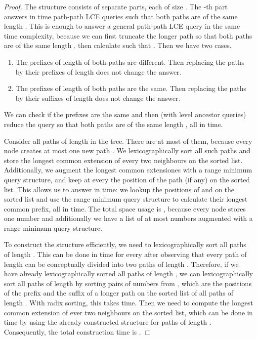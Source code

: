 \documentclass [10pt]{article}
\newcommand{\qed}{\hfill\ensuremath{\Box}\medskip\\\noindent}
\newenvironment{proof}{\noindent\emph{Proof. }}{}
\begin{document}
\begin{proof}
The structure consists of  separate parts, each of size . The -th part answers in  time path-path LCE queries such that both
paths are of the same length . This is enough to answer a general path-path LCE query in the same time complexity, because we can first
truncate the longer path so that both paths are of the same length , then calculate  such that . Then
we have two cases.

\begin{enumerate}
\item The prefixes of length  of both paths are different. Then replacing the paths by their prefixes of length  does not
change the answer.
\item The prefixes of length  of both paths are the same. Then replacing the paths by their suffixes of length  does not
change the answer.
\end{enumerate}

We can check if the prefixes are the same and then (with level ancestor queries) reduce the query so that both paths are
of the same length , all in  time.

Consider all paths of length  in the tree. There are at most  of them, because every node  creates at most one new path
. We lexicographically sort all such paths and store the longest common extension of every two neighbours
on the sorted list. Additionally, we augment the longest common extensiones with a range minimum query structure, and keep at every  the
position of the path  (if any) on the sorted list. This allows us to answer
 in  time: we lookup the positions of 
and  on the sorted list and use the range minimum query structure to calculate their longest common
prefix, all in  time. The total space usage is , because every node stores one number and additionally we have a list of at most
 numbers augmented with a range minimum query structure.

To construct the structure efficiently, we need to lexicographically sort all paths of length . This can be done in  time for every  after
observing that every path of length  can be conceptually divided into two paths of length . Therefore, if we have already
lexicographically sorted all paths of length , we can lexicographically sort all paths of length  by sorting pairs of numbers
from , which are the positions of the prefix and the suffix of a longer path on the sorted list of all paths of length . With
radix sorting, this takes  time. Then we need to compute the longest common extension of ever two neighbours on the sorted list,
which can be done in  time by using the already constructed structure for paths of length . Consequently, the total construction
time is .
\qed
\end{proof}
\end{document}
